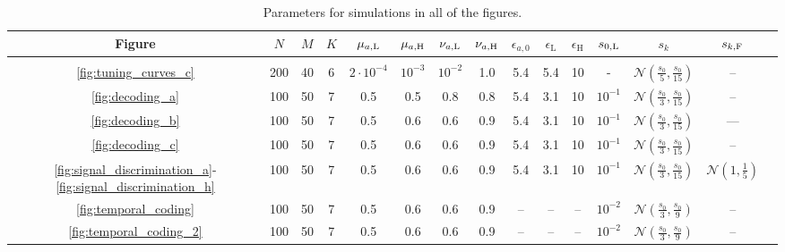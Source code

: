 \documentclass[9pt,twocolumn,twoside,lineno]{pnas-new}
\begin{document}
\begin{table}[!tb]
	\centering
	{\small
		\begin{tabular}{ccccccccccccccc}
			Figure & $N$& $M$ & $K$ & $\mu_{a, \text L}$ & $\mu_{a, \text H}$ & $\nu_{a, \text L}$ & $\nu_{a, \text H}$ & $\epsilon_{a, 0}$ & $\epsilon_{\text {L}}$  & $\epsilon_{\text {H}}$  & $s_{0, \text L}$ & $s_k$ & $s_{k, \text F}$\\[0.1cm]
			
			\hline \\[-0.2cm]
			\smallskip
			
			\ref{fig:tuning_curves_c} & 200 & 40 & 6 & $2\cdot 10^{-4}$ & $10^{-3}$ & $10^{-2}$ & 1.0 & 5.4 & 5.4 & 10  & - & $ \mathcal N\left(\frac{s_0}{5}, \frac{s_0}{15}\right)$ & --\\
			
			\ref{fig:decoding_a} & 100 & 50 & 7 & 0.5 & 0.5 & 0.8 & 0.8 & 5.4 & 3.1 & 10  & $10^{-1}$ & $ \mathcal N\left(\frac{s_0}{3}, \frac{s_0}{15}\right)$ & -- \\
			
			\ref{fig:decoding_b} & 100 & 50 & 7 & 0.5 & 0.6 & 0.6 & 0.9 & 5.4 & 3.1 & 10 & $10^{-1}$ & $ \mathcal N\left(\frac{s_0}{3}, \frac{s_0}{15}\right)$ & ---\\
			
			\ref{fig:decoding_c} & 100 & 50 & 7 & 0.5 & 0.6 & 0.6 & 0.9 & 5.4 & 3.1 & 10 & $10^{-1}$ & $ \mathcal N\left(\frac{s_0}{3}, \frac{s_0}{15}\right)$ & -- \\
			
			\ref{fig:signal_discrimination_a}-\ref{fig:signal_discrimination_h} & 100 & 50 & 7 & 0.5 & 0.6 & 0.6 & 0.9 & 5.4 & 3.1 & 10 & $10^{-1}$ & $ \mathcal N\left(\frac{s_0}{3}, \frac{s_0}{15}\right)$ & $ \mathcal N(1, \frac{1}{5})$ \\
			
			\ref{fig:temporal_coding} & 100 & 50 & 7 & 0.5 & 0.6 & 0.6 & 0.9 & -- & -- & -- & $10^{-2}$ & $ \mathcal N\left(\frac{s_0}{3}, \frac{s_0}{9}\right)$ & -- \\
			
			\ref{fig:temporal_coding_2} & 100 & 50 & 7 & 0.5 & 0.6 & 0.6 & 0.9 & -- & -- & -- & $10^{-2}$ & $ \mathcal N\left(\frac{s_0}{3}, \frac{s_0}{9}\right)$ & -- \\
		\end{tabular}
	}
	\caption{Parameters for simulations in all of the figures.}
	\label{tab:params}
\end{table}
\end{document}
